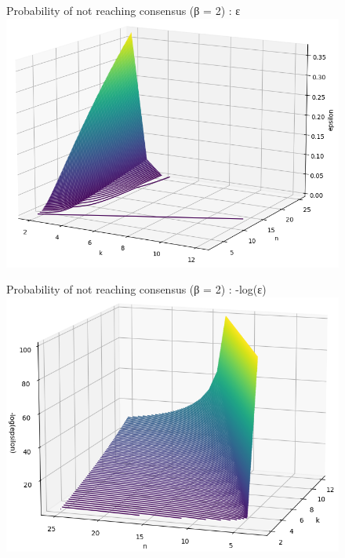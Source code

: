\documentclass[11pt, twocolumn]{article}
\begin{document}
\begin{appendices}
\begin{figure}
    \end{figure}
    \begin{figure}
        Probability of not reaching consensus (β = 2) : ε 
        \centering
        \includegraphics[width=16.5cm]{images/smallnoconsensus.png}
    \end{figure}
    \begin{figure}
        Probability of not reaching consensus (β = 2) : -log(ε) 
        \centering
        \includegraphics[width=16.5cm]{images/smalllognoconsensus.png}
    \end{figure}
\end{appendices}
\end{document}
